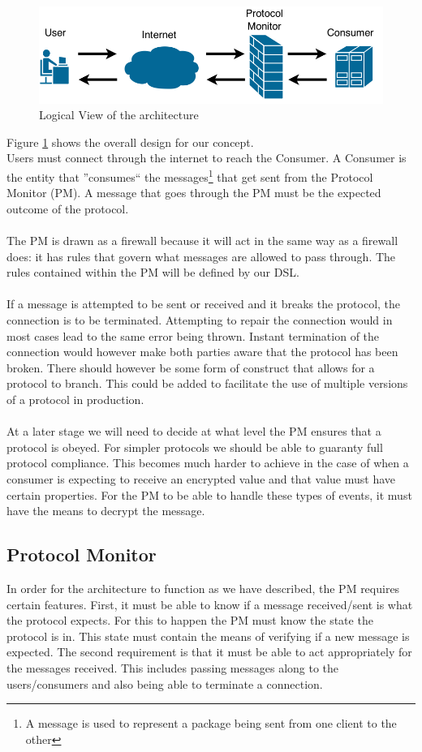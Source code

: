 \begin{figure}[h]
	\centering
	\includegraphics[scale=0.45]{images/architecture/ArchitectureFigure1.png} 
	\caption{Logical View of the architecture}
	\label{fig:ArchitectureFigure1}
\end{figure}
Figure \ref{fig:ArchitectureFigure1} shows the overall design for our concept. 
\\
Users must connect through the internet to reach the Consumer. A Consumer is the entity that ''consumes`` the messages\footnote{A message is used to represent a package being sent from one client to the other} that get sent from the Protocol Monitor (PM). A message that goes through the PM must be the expected outcome of the protocol.
\\\\
The PM is drawn as a firewall because it will act in the same way as a firewall does: it has rules that govern what messages are allowed to pass through. The rules contained within the PM will be defined by our DSL.
\\\\
If a message is attempted to be sent or received and it breaks the protocol, the connection is to be terminated. Attempting to repair the connection would in most cases lead to the same error being thrown. Instant termination of the connection would however make both parties aware that the protocol has been broken. There should however be some form of construct that allows for a protocol to branch. This could be added to facilitate the use of multiple versions of a protocol in production.
\\\\
At a later stage we will need to decide at what level the PM ensures that a protocol is obeyed. For simpler protocols we should be able to guaranty full protocol compliance. This becomes much harder to achieve in the case of when a consumer is expecting to receive an encrypted value and that value must have certain properties. For the PM to be able to handle these types of events, it must have the means to decrypt the message.

\subsection{Protocol Monitor}
In order for the architecture to function as we have described, the PM requires certain features. First, it must be able to know if a message received/sent is what the protocol expects. For this to happen the PM must know the state the protocol is in. This state must contain the means of verifying if a new message is expected. The second requirement is that it must be able to act appropriately for the messages received. This includes passing messages along to the users/consumers and also being able to terminate a connection.
